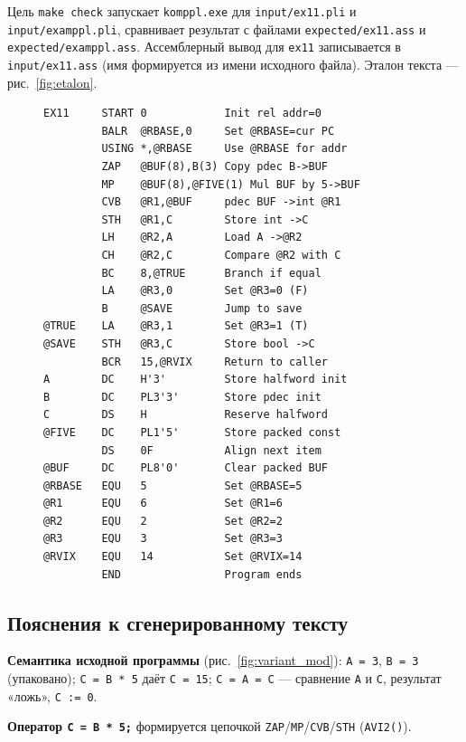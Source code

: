 \documentclass[a4paper,14pt]{extarticle}
\begin{document}
Цель \texttt{make check} запускает \texttt{komppl.exe} для \texttt{input/ex11.pli} и \texttt{input/examppl.pli}, сравнивает результат с
файлами \texttt{expected/ex11.ass} и \texttt{expected/examppl.ass}. Ассемблерный вывод для \texttt{ex11} записывается в \texttt{input/ex11.ass}
(имя формируется из имени исходного файла). Эталон текста --- рис.~\ref{fig:etalon}.

\begin{figure}[H]
\begin{lstlisting}[style=ASMstyle,caption={Ожидаемый фрагмент ассемблерного вывода (совпадение с рис.~\ref{fig:etalon})},label=lst:result_asm4]
EX11     START 0            Init rel addr=0
         BALR  @RBASE,0     Set @RBASE=cur PC
         USING *,@RBASE     Use @RBASE for addr
         ZAP   @BUF(8),B(3) Copy pdec B->BUF
         MP    @BUF(8),@FIVE(1) Mul BUF by 5->BUF
         CVB   @R1,@BUF     pdec BUF ->int @R1
         STH   @R1,C        Store int ->C
         LH    @R2,A        Load A ->@R2
         CH    @R2,C        Compare @R2 with C
         BC    8,@TRUE      Branch if equal
         LA    @R3,0        Set @R3=0 (F)
         B     @SAVE        Jump to save
@TRUE    LA    @R3,1        Set @R3=1 (T)
@SAVE    STH   @R3,C        Store bool ->C
         BCR   15,@RVIX     Return to caller
A        DC    H'3'         Store halfword init
B        DC    PL3'3'       Store pdec init
C        DS    H            Reserve halfword
@FIVE    DC    PL1'5'       Store packed const
         DS    0F           Align next item
@BUF     DC    PL8'0'       Clear packed BUF
@RBASE   EQU   5            Set @RBASE=5
@R1      EQU   6            Set @R1=6
@R2      EQU   2            Set @R2=2
@R3      EQU   3            Set @R3=3
@RVIX    EQU   14           Set @RVIX=14
         END                Program ends
\end{lstlisting}
\end{figure}

\subsection*{Пояснения к сгенерированному тексту}

\textbf{Семантика исходной программы} (рис.~\ref{fig:variant_mod}): \texttt{A = 3}, \texttt{B = 3} (упаковано);
\texttt{C = B * 5} даёт \texttt{C = 15}; \texttt{C = A = C} — сравнение \texttt{A} и \texttt{C}, результат «ложь», \texttt{C := 0}.

\textbf{Оператор \texttt{C = B * 5;}} формируется цепочкой \texttt{ZAP}/\texttt{MP}/\texttt{CVB}/\texttt{STH} (\texttt{AVI2()}).
\end{document}
